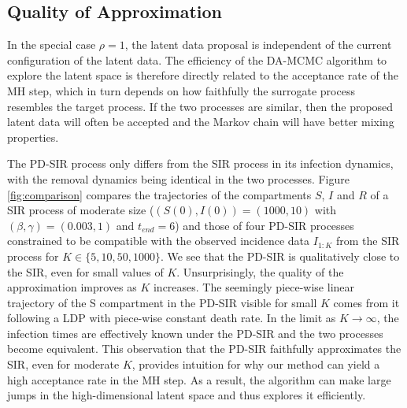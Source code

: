 \documentclass[12pt]{article}
\begin{document}
\subsection{Quality of Approximation}
\label{sec:qua}

In the special case $\rho=1$, the latent data proposal is independent of the current configuration of the latent data. The efficiency of the DA-MCMC algorithm to explore the latent space is therefore directly related to the acceptance rate of the MH step, which in turn depends on how faithfully the surrogate process resembles the target process. If the two processes are similar, then the proposed latent data will often be accepted and the Markov chain will have better mixing properties.

The PD-SIR process only differs from the SIR process in its infection dynamics, with the removal dynamics being identical in the two processes. Figure \ref{fig:comparison} compares the trajectories of the compartments $S$, $I$ and $R$ of a SIR process of moderate size ($(S(0), I(0)) = (1000, 10)$ with $(\beta, \gamma) = (0.003, 1)$ and $t_{end} = 6$) and those of four PD-SIR processes constrained to be compatible with the observed incidence data $I_{1:K}$ from the SIR process for $K \in \{5, 10, 50, 1000\}$. We see that the PD-SIR is qualitatively close to the SIR, even for small values of $K$. Unsurprisingly, the quality of the approximation improves as $K$ increases. The seemingly piece-wise linear trajectory of the S compartment in the PD-SIR visible for small $K$ comes from it following a LDP with piece-wise constant death rate. In the limit as $K \rightarrow \infty$, the infection times are effectively known under the PD-SIR and the two processes become equivalent.
This observation that the PD-SIR faithfully approximates  the SIR, even for moderate $K$, provides intuition for why our method can yield a high acceptance rate in the MH step. As a result, the algorithm can make large jumps in the high-dimensional latent space and thus explores it efficiently. %
\end{document}
